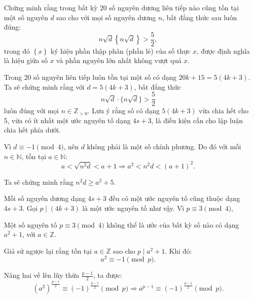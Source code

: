 \ifshowproblemandsoln
\ifshowproblem\begin{problem}\label{problem:BMO-2015-P4}\fi
\ifshowsoln\begin{problem}\fi
    Chứng minh rằng trong bất kỳ \( 20 \) số nguyên dương liên tiếp nào cũng tồn tại một số nguyên \( d \)
    sao cho với mọi số nguyên dương \( n \), bất đẳng thức sau luôn đúng:
    \[
        n \sqrt{d} \left\{ n \sqrt{d} \right\} > \frac{5}{2},
    \]
    trong đó \( \left\{ x \right\} \) ký hiệu phần thập phân (phần lẻ) của số thực \( x \),
    được định nghĩa là hiệu giữa số \( x \) và phần nguyên lớn nhất không vượt quá \( x \).    
\end{problem}
\fi

\ifshowsoln
\begin{soln}\footnotemark
    Trong 20 số nguyên liên tiếp luôn tồn tại một số có dạng \( 20k + 15 = 5(4k + 3) \). Ta sẽ chứng minh rằng với \( d = 5(4k + 3) \), bất đẳng thức
    \[
        n \sqrt{d} \cdot \{n \sqrt{d}\} > \frac{5}{2}
    \]
    luôn đúng với mọi \( n \in \mathbb{Z}_{>0} \). Lưu ý rằng số có dạng \( 5(4k + 3) \) vừa chia hết cho 5,
    vừa có ít nhất một ước nguyên tố dạng \( 4s + 3 \), là điều kiện cần cho lập luận chia hết phía dưới.

    Vì \( d \equiv -1 \pmod{4} \), nên \( d \) không phải là một số chính phương. Do đó với mỗi \( n \in \mathbb{N} \), tồn tại \( a \in \mathbb{N} \):
    \[
        a < \sqrt{n^2 d} < a + 1 \Rightarrow a^2 < n^2 d < (a + 1)^2.
    \]

    Ta sẽ chứng minh rằng \( n^2 d \ge a^2 + 5 \).

    Mỗi số nguyên dương dạng \( 4s + 3 \) đều có một ước nguyên tố cũng thuộc dạng \( 4s + 3 \).
    Gọi \( p \mid (4k + 3) \) là một ước nguyên tố như vậy. Vì \( p \equiv 3 \pmod{4} \),

    \begin{lemma*}
        Một số nguyên tố \( p \equiv 3 \pmod{4} \) không thể là ước của bất kỳ số nào có dạng \( a^2 + 1 \), với \( a \in \mathbb{Z} \).
    \end{lemma*}
    
    \begin{subproof}
        Giả sử ngược lại rằng tồn tại \( a \in \mathbb{Z} \) sao cho \( p \mid a^2 + 1 \). Khi đó:
        \[
            a^2 \equiv -1 \pmod{p}.
        \]

        Nâng hai vế lên lũy thừa \( \frac{p - 1}{2} \), ta được:
        \[
            (a^2)^{\frac{p-1}{2}} \equiv (-1)^{\frac{p-1}{2}} \pmod{p} \Rightarrow a^{p-1} \equiv (-1)^{\frac{p-1}{2}} \pmod{p}.
        \]


\end{subproof}
\end{soln}
\end{problem}
